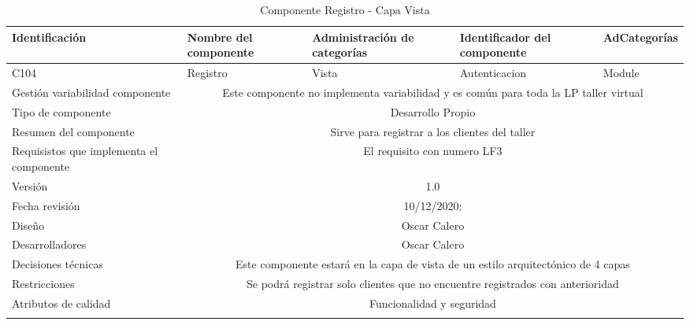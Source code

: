 \documentclass[10pt,a4paper,openany]{book}
\begin{document}
\begin{longtable}{|p{3cm}|p{3cm}|p{3cm}|p{3cm}|p{3cm}|} \hline
Identificación & Nombre del componente & Administración de categorías & Identificador del componente & AdCategorías \\[0.5ex] \hline
C104& Registro& Vista& Autenticacion& Module\\[0.5ex] \hline
Gestión variabilidad componente & \multicolumn{4}{|c|}{Este componente no implementa variabilidad y es común para toda la LP taller virtual} \\ \hline
Tipo de componente & \multicolumn{4}{|c|}{Desarrollo Propio} \\ \hline
Resumen del componente & \multicolumn{4}{|c|}{Sirve para registrar a los clientes del taller} \\ \hline
Requisistos que implementa el componente & \multicolumn{4}{|c|}{El requisito con numero LF3 } \\ \hline
Versión & \multicolumn{4}{|c|}{1.0 } \\ \hline
Fecha revisión & \multicolumn{4}{|c|}{ 10/12/2020:} \\ \hline
Diseño & \multicolumn{4}{|c|}{Oscar Calero} \\ \hline
Desarrolladores & \multicolumn{4}{|c|}{Oscar Calero} \\ \hline
Decisiones técnicas & \multicolumn{4}{|c|}{Este componente estará en la capa de vista de un estilo arquitectónico de 4 capas  } \\ \hline
Restricciones & \multicolumn{4}{|c|}{Se podrá registrar solo clientes que no encuentre registrados con anterioridad} \\ \hline
Atributos de calidad & \multicolumn{4}{|c|}{Funcionalidad y seguridad} \\ \hline
\caption{Componente Registro - Capa Vista}
\label{table:t6}
\end{longtable}
\end{document}
